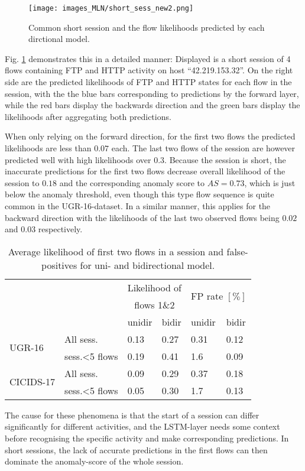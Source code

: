 \begin{figure}[ht]
\centering
\texttt{[image: images\_MLN/short\_sess\_new2.png]} \caption{Common short session and the flow likelihoods predicted by each dirctional model.}\label{fig:short_sess}
\end{figure}

Fig. \ref{fig:short_sess} demonstrates this in a detailed manner: Displayed is a short session of 4 flows containing FTP and HTTP activity on host ``42.219.153.32''. On the right side are the predicted likelihoods of FTP and HTTP states for each flow in the session, with the the blue bars corresponding to predictions by the forward layer, while the red bars display the backwards direction and the green bars display the likelihoods after aggregating both predictions. 

When only relying on the forward direction, for the first two flows the predicted likelihoods are less than $0.07$ each. 
The last two flows of the session are however predicted well with high likelihoods over $0.3$. Because the session is short, the inaccurate predictions for the first two flows decrease overall likelihood of the session to $0.18$ and the corresponding anomaly score to $AS=0.73$, which is just below the anomaly threshold, even though this type flow sequence is quite common in the UGR-16-dataset.
In a similar manner, this applies for the backward direction with  the likelihoods of the last two observed flows being $0.02$ and $0.03$ respectively. 

\begin{table}[ht]
\centering
\begin{tabular}{l|l|l|l|l|l}
& & \multicolumn{2}{c|}{Likelihood of}&\multicolumn{2}{c}{\multirow{2}{*}{FP rate $[\%]$}}\\
& & \multicolumn{2}{c|}{flows 1\&2} &\multicolumn{2}{c}{} \\
&& unidir & bidir& unidir& bidir\\  \hline \hline
\multirow{2}{*}{UGR-16}&All sess.& 0.13&0.27 &0.31 & 0.12\\  \cline{2-6}
&sess.<5 flows& 0.19 & 0.41 & 1.6& 0.09\\  \hline \hline
\multirow{2}{*}{CICIDS-17}&All sess.& 0.09& 0.29& 0.37& 0.18\\  \cline{2-6}
&sess.<5 flows& 0.05 & 0.30 & 1.7& 0.13\\  \hline
\end{tabular}
\caption{Average likelihood of first two flows in a session and false-positives for uni- and bidirectional model.}\label{Tab:bidir}
\end{table}
The cause for these phenomena is that the start of a session can differ significantly for different activities, and the LSTM-layer needs some context before recognising the specific activity and make corresponding predictions. In short sessions, the lack of accurate predictions in the first flows can then dominate the anomaly-score of the whole session.

